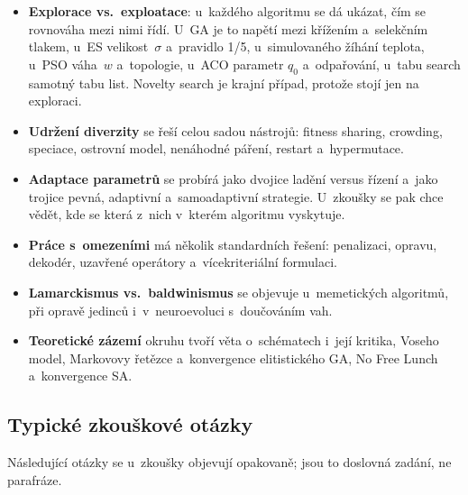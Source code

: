 \documentclass[11pt,a4paper]{article}
\theoremstyle{definition}
\begin{document}
\begin{itemize}
\item \textbf{Explorace vs.\ exploatace}: u~každého algoritmu se dá ukázat, čím se rovnováha
  mezi nimi řídí. U~GA je to napětí mezi křížením a~selekčním tlakem, u~ES velikost~$\sigma$
  a~pravidlo 1/5, u~simulovaného žíhání teplota, u~PSO váha~$w$ a~topologie, u~ACO parametr
  $q_0$ a~odpařování, u~tabu search samotný tabu list. Novelty search je krajní případ, protože
  stojí jen na exploraci.
\item \textbf{Udržení diverzity} se řeší celou sadou nástrojů: fitness sharing, crowding,
  speciace, ostrovní model, nenáhodné páření, restart a~hypermutace.
\item \textbf{Adaptace parametrů} se probírá jako dvojice ladění versus řízení a~jako trojice
  pevná, adaptivní a~samoadaptivní strategie. U~zkoušky se pak chce vědět, kde se která z~nich
  v~kterém algoritmu vyskytuje.
\item \textbf{Práce s~omezeními} má několik standardních řešení: penalizaci, opravu, dekodér,
  uzavřené operátory a~vícekriteriální formulaci.
\item \textbf{Lamarckismus vs.\ baldwinismus} se objevuje u~memetických algoritmů, při opravě
  jedinců i~v~neuroevoluci s~douč\-ováním vah.
\item \textbf{Teoretické zázemí} okruhu tvoří věta o~schématech i~její kritika, Voseho model,
  Markovovy řetězce a~konvergence elitistického GA, No Free Lunch a~konvergence SA.
\end{itemize}

\subsection*{Typické zkouškové otázky}

Následující otázky se u~zkoušky objevují opakovaně; jsou to doslovná zadání, ne parafráze.
\end{document}
